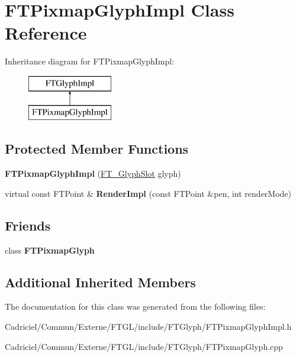 \hypertarget{class_f_t_pixmap_glyph_impl}{}\section{F\+T\+Pixmap\+Glyph\+Impl Class Reference}
\label{class_f_t_pixmap_glyph_impl}
Inheritance diagram for F\+T\+Pixmap\+Glyph\+Impl\+:\begin{figure}[H]
\begin{center}
\leavevmode
\includegraphics[height=2.000000cm]{class_f_t_pixmap_glyph_impl}
\end{center}
\end{figure}
\subsection*{Protected Member Functions}
\begin{DoxyCompactItemize}
\item 
{\bfseries F\+T\+Pixmap\+Glyph\+Impl} (\hyperlink{struct_f_t___glyph_slot_rec__}{F\+T\+\_\+\+Glyph\+Slot} glyph)\hypertarget{class_f_t_pixmap_glyph_impl_a65e1773b7c1f422abbccd90399cd3ec4}{}\label{class_f_t_pixmap_glyph_impl_a65e1773b7c1f422abbccd90399cd3ec4}

\item 
virtual const F\+T\+Point \& {\bfseries Render\+Impl} (const F\+T\+Point \&pen, int render\+Mode)\hypertarget{class_f_t_pixmap_glyph_impl_a9c5cf9105b59301f0b27cfa2350012c6}{}\label{class_f_t_pixmap_glyph_impl_a9c5cf9105b59301f0b27cfa2350012c6}

\end{DoxyCompactItemize}
\subsection*{Friends}
\begin{DoxyCompactItemize}
\item 
class {\bfseries F\+T\+Pixmap\+Glyph}\hypertarget{class_f_t_pixmap_glyph_impl_ab141fccf761e39b9e4bec64cda0507a7}{}\label{class_f_t_pixmap_glyph_impl_ab141fccf761e39b9e4bec64cda0507a7}

\end{DoxyCompactItemize}
\subsection*{Additional Inherited Members}


The documentation for this class was generated from the following files\+:\begin{DoxyCompactItemize}
\item 
Cadriciel/\+Commun/\+Externe/\+F\+T\+G\+L/include/\+F\+T\+Glyph/F\+T\+Pixmap\+Glyph\+Impl.\+h\item 
Cadriciel/\+Commun/\+Externe/\+F\+T\+G\+L/include/\+F\+T\+Glyph/F\+T\+Pixmap\+Glyph.\+cpp\end{DoxyCompactItemize}
